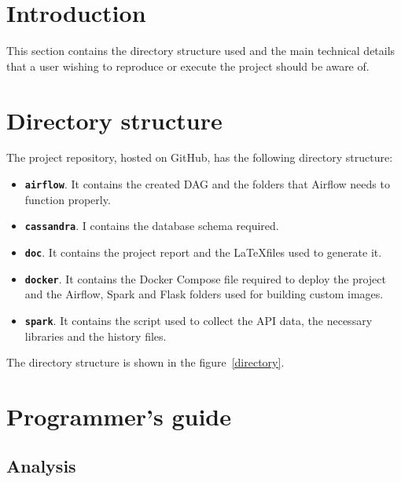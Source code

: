 
\section{Introduction}

\nonzeroparskip This section contains the directory structure used and the main technical details that a user wishing to reproduce or execute the project should be aware of.

\section{Directory structure}
\nonzeroparskip The project repository, hosted on GitHub, has the following directory structure:
\begin{itemize}
	\item \textbf{\texttt{airflow}}. It contains the created DAG and the folders that Airflow needs to function properly.
	\item \textbf{\texttt{cassandra}}. I contains the database schema required.
	\item \textbf{\texttt{doc}}. It contains the project report and the \LaTeX files used to generate it.
	\item \textbf{\texttt{docker}}. It contains the Docker Compose file required to deploy the project and the Airflow, Spark and Flask folders used for building custom images.
	\item \textbf{\texttt{spark}}. It contains the script used to collect the API data, the necessary libraries and the history files.
\end{itemize}

\nonzeroparskip The directory structure is shown in the figure~\ref{directory}.


\section{Programmer's guide}

\subsection{Analysis}

